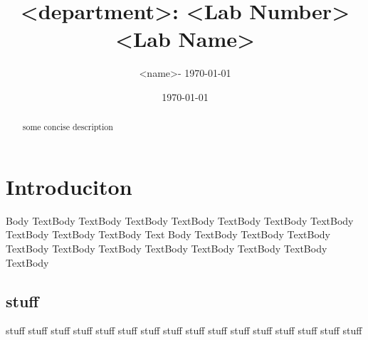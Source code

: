 \documentclass[12pt,article]{IEEEtran}
\begin{document}
	\renewcommand{\topfraction}{0.9}	%
	\renewcommand{\bottomfraction}{0.8}	%

	\setcounter{topnumber}{2}
	\setcounter{bottomnumber}{2}
	\setcounter{totalnumber}{4}     %
	\setcounter{dbltopnumber}{2}    %
	\renewcommand{\dbltopfraction}{0.9}	%
	\renewcommand{\textfraction}{0.07}	%

	\renewcommand{\floatpagefraction}{0.7}	%

	\renewcommand{\dblfloatpagefraction}{0.7}	%

\title{<department>: <Lab Number> \\
		<Lab Name>}
\author{<name>- \today}
\date{\today}
\maketitle

\begin{abstract}
	some concise description
\end{abstract}

\section{Introduciton}
Body TextBody TextBody TextBody TextBody TextBody TextBody TextBody TextBody TextBody TextBody Text
Body TextBody TextBody TextBody TextBody TextBody TextBody TextBody TextBody TextBody TextBody TextBody

	\subsection{stuff}
	stuff stuff stuff stuff stuff stuff stuff stuff stuff stuff stuff stuff stuff stuff stuff stuff
	

	
	
\end{document}
